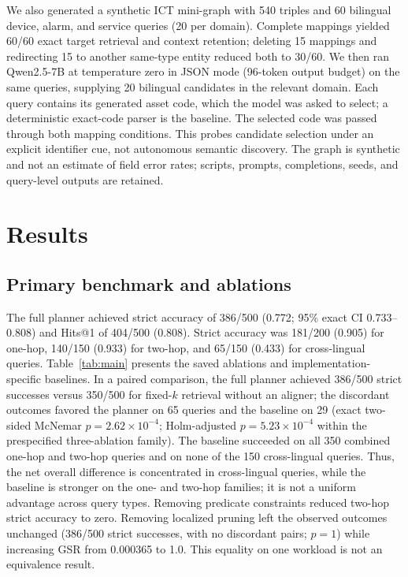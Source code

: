 \documentclass[a4paper,fleqn]{cas-dc}
\begin{document}
We also generated a synthetic ICT mini-graph with 540 triples and 60 bilingual device, alarm, and service queries (20 per domain). Complete mappings yielded 60/60 exact target retrieval and context retention; deleting 15 mappings and redirecting 15 to another same-type entity reduced both to 30/60. We then ran Qwen2.5-7B at temperature zero in JSON mode (96-token output budget) on the same queries, supplying 20 bilingual candidates in the relevant domain. Each query contains its generated asset code, which the model was asked to select; a deterministic exact-code parser is the baseline. The selected code was passed through both mapping conditions. This probes candidate selection under an explicit identifier cue, not autonomous semantic discovery. The graph is synthetic and not an estimate of field error rates; scripts, prompts, completions, seeds, and query-level outputs are retained.

\section{Results}\label{sec:results}
\subsection{Primary benchmark and ablations}
The full planner achieved strict accuracy of 386/500 (0.772; 95\% exact CI 0.733--0.808) and Hits@1 of 404/500 (0.808). Strict accuracy was 181/200 (0.905) for one-hop, 140/150 (0.933) for two-hop, and 65/150 (0.433) for cross-lingual queries. Table~\ref{tab:main} presents the saved ablations and implementation-specific baselines. In a paired comparison, the full planner achieved 386/500 strict successes versus 350/500 for fixed-$k$ retrieval without an aligner; the discordant outcomes favored the planner on 65 queries and the baseline on 29 (exact two-sided McNemar $p=2.62\times10^{-4}$; Holm-adjusted $p=5.23\times10^{-4}$ within the prespecified three-ablation family). The baseline succeeded on all 350 combined one-hop and two-hop queries and on none of the 150 cross-lingual queries. Thus, the net overall difference is concentrated in cross-lingual queries, while the baseline is stronger on the one- and two-hop families; it is not a uniform advantage across query types. Removing predicate constraints reduced two-hop strict accuracy to zero. Removing localized pruning left the observed outcomes unchanged (386/500 strict successes, with no discordant pairs; $p=1$) while increasing GSR from 0.000365 to 1.0. This equality on one workload is not an equivalence result.
\end{document}
